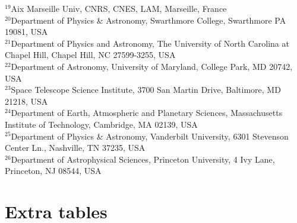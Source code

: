 \documentclass[fleqn,usenatbib]{mnras}
\begin{document}
$^{19}$Aix Marseille Univ, CNRS, CNES, LAM, Marseille, France\\
$^{20}$Department of Physics \& Astronomy, Swarthmore College, Swarthmore PA 19081, USA\\
$^{21}$Department of Physics and Astronomy, The University of North Carolina at Chapel Hill, Chapel Hill, NC 27599-3255, USA\\
$^{22}$Department of Astronomy, University of Maryland, College Park, MD 20742, USA\\
$^{23}$Space Telescope Science Institute, 3700 San Martin Drive, Baltimore, MD 21218, USA\\
$^{24}$Department of Earth, Atmospheric and Planetary Sciences, Massachusetts Institute of Technology, Cambridge, MA 02139, USA\\
$^{25}$Department of Physics \& Astronomy, Vanderbilt University, 6301 Stevenson Center Ln., Nashville, TN 37235, USA\\
$^{26}$Department of Astrophysical Sciences, Princeton University, 4 Ivy Lane, Princeton, NJ 08544, USA\\

\section{Extra tables}
\end{document}
